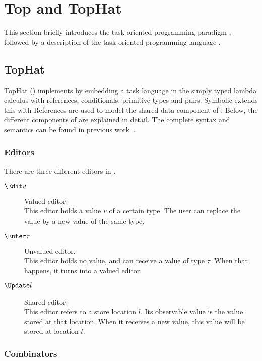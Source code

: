
\section{Top and TopHat}
\label{sec:tophat}

This section briefly introduces the task-oriented programming paradigm \TOP,
followed by a description of the task-oriented programming language \TOPHAT.



\subsection{TopHat}

TopHat (\TOPHAT) implements \TOP by embedding a task language in the simply typed lambda calculus with references, conditionals, primitive types and pairs.
Symbolic \TOPHAT extends this with 
References are used to model the shared data component of \TOP.
Below, the different components of \TOPHAT are explained in detail.
The complete syntax and semantics can be found in previous work~\cite{Steenvoorden2019}.


\subsubsection{Editors}

There are three different editors in \TOPHAT.
\begin{description}
  \item[$\Edit v$] Valued editor.\\
    This editor holds a value $v$ of a certain type.
    The user can replace the value by a new value of the same type.
  \item[$\Enter \tau$] Unvalued editor.\\
    This editor holds no value, and can receive a value of type $\tau$.
    When that happens, it turns into a valued editor.
  \item[$\Update l$] Shared editor.\\
    This editor refers to a store location $l$.
    Its observable value is the value stored at that location.
    When it receives a new value, this value will be stored at location $l$.
\end{description}


\subsubsection{Combinators}

